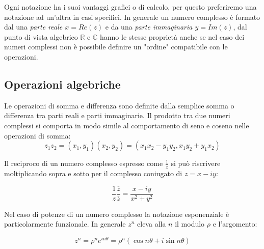 \documentclass[x11names]{article}
\begin{document}
\noindent
Ogni notazione ha i suoi vantaggi grafici o di calcolo, per questo preferiremo una notazione ad un'altra in casi specifici. In generale un numero complesso è formato dal una \textit{parte reale $x = Re(z)$} e da una \textit{parte immaginaria $y=Im(z)$}, dal punto di vista algebrico $\mathbb{R} $ e $ \mathbb{C}$ hanno le stesse proprietà anche se nel caso dei numeri complessi non è possibile definire un "ordine" compatibile con le operazioni.

\subsection{Operazioni algebriche}
Le operazioni di somma e differenza sono definite dalla semplice somma o differenza tra parti reali e parti immaginarie. Il prodotto tra due numeri complessi si comporta in modo simile al comportamento di seno e coseno nelle operazioni di somma:
$$
z_1 z_2 = (x_1, y_1)(x_2, y_2) = (x_1 x_2 - y_1 y_2, x_1 y_2 + y_1 x_2)
$$

\vspace{0.7em}
\noindent



Il reciproco di un numero complesso espresso come $\frac{1}{z}$ si può riscrivere moltiplicando sopra e sotto per il complesso coniugato di $z = x - iy$:

\[
\frac{1}{z}\frac{\overline{z}}{\overline{z}} = \frac{x-iy}{x^2 + y^2}
\]

Nel caso di potenze di un numero complesso la notazione esponenziale è particolarmente funzionale. In generale $z^n$ eleva alla $n$ il modulo $\rho$ e l'argomento:

\[
z^n = \rho^n e^{in\theta} =  \rho^n(\cos{n\theta} + i\sin{n\theta}) 
\]
\end{document}
